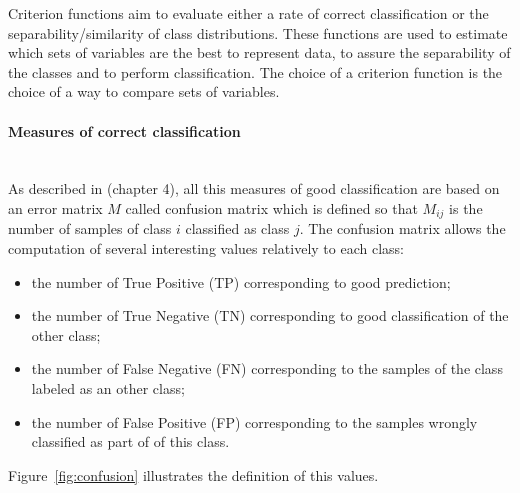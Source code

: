 \documentclass[journal,peerreview,onecolumn]{IEEEtran}
\begin{document}
        Criterion functions aim to evaluate either a rate of correct classification or the separability/similarity of class distributions. These functions are used to estimate which sets of variables are the best to represent data, to assure the separability of the classes and to perform classification. The choice of a criterion function is the choice of a way to compare sets of variables.

            \paragraph{Measures of correct classification}
            \label{sec:criterion-rate}

            \hspace{0pt} \\

            As described in \cite{congalton2008assessing} (chapter 4), all this measures of good classification are based on an error matrix $M$ called confusion matrix which is defined so that $M_{ij}$ is the number of samples of class $i$ classified as class $j$. The confusion matrix allows the computation of several interesting values relatively to each class:
            \begin{itemize}
                \item the number of True Positive (TP) corresponding to good prediction;
                \item the number of True Negative (TN) corresponding to good classification of the other class;
                \item the number of False Negative (FN) corresponding to the samples of the class labeled as an other class;
                \item the number of False Positive (FP) corresponding to the samples wrongly classified as part of of this class.
            \end{itemize}
            Figure~\ref{fig:confusion} illustrates the definition of this values.
\end{document}
